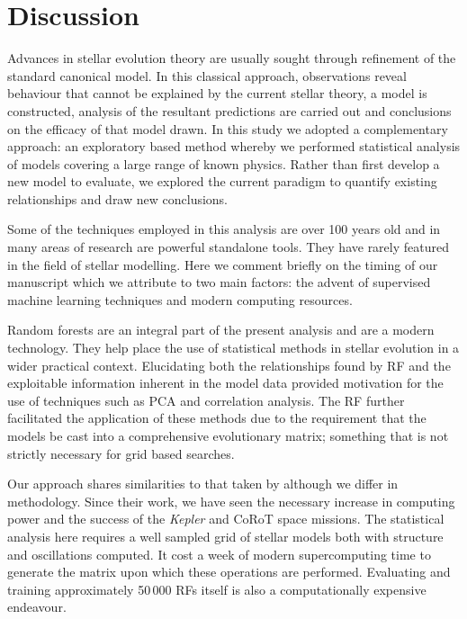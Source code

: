 \section{Discussion}
\label{sec:disc}


Advances in stellar evolution theory are usually sought through refinement of the standard canonical model.  In this classical approach, observations reveal  behaviour that cannot be explained by the current stellar theory, a model is constructed, analysis of the resultant predictions are carried out and conclusions on the efficacy of that model drawn. In this study we adopted a complementary approach: an exploratory based method whereby we performed statistical analysis of models covering a large range of known physics. Rather than first develop a new model to evaluate, we explored the current paradigm to quantify existing relationships and draw new conclusions.  

Some of the techniques employed in this analysis are over 100 years old and in many areas of research are powerful standalone tools. They have rarely featured in the field of stellar modelling. Here we comment briefly on the timing of our manuscript which we attribute to two main factors: the advent of supervised machine learning techniques and modern computing resources.  

Random forests are an integral part of the present analysis and are a modern technology.
They help place the use of statistical methods in stellar evolution in a wider practical context.  Elucidating both the relationships found by RF and the exploitable information inherent in the model data provided motivation for the use of techniques such as PCA and correlation analysis.  The RF further facilitated the application of these methods due to the requirement that the models be cast  into a comprehensive evolutionary matrix; something that is not strictly necessary for grid based searches.     

Our approach shares similarities to that taken by \citet{1994ApJ...427.1013B} although we differ in methodology. Since their work, we have seen the necessary increase in computing power and the success of the \emph{Kepler} and CoRoT space missions.  The statistical analysis here requires a well sampled grid of stellar models both with structure and oscillations computed. It cost a week of modern supercomputing time to generate the matrix upon which these operations are performed. Evaluating and training approximately 50\,000  RFs itself is also a computationally expensive endeavour.


